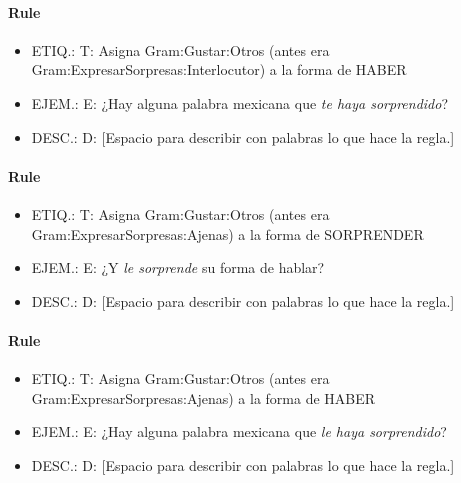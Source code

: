 \documentclass[11pt]{report}
\begin{document}
\paragraph*{Rule}
\begin{itemize}
\item ETIQ.:  T: Asigna Gram:Gustar:Otros (antes era Gram:ExpresarSorpresas:Interlocutor) a la forma de HABER
\item EJEM.:  E: ¿Hay alguna palabra mexicana que \emph{te haya sorprendido}?
\item DESC.:  D: [Espacio para describir con palabras lo que hace la regla.]
\end{itemize}

\paragraph*{Rule}
\begin{itemize}
\item ETIQ.:  T: Asigna Gram:Gustar:Otros (antes era Gram:ExpresarSorpresas:Ajenas) a la forma de SORPRENDER
\item EJEM.:  E: ¿Y \emph{le sorprende} su forma de hablar?
\item DESC.:  D: [Espacio para describir con palabras lo que hace la regla.]
\end{itemize}

\paragraph*{Rule}
\begin{itemize}
\item ETIQ.:  T: Asigna Gram:Gustar:Otros (antes era Gram:ExpresarSorpresas:Ajenas) a la forma de HABER
\item EJEM.:  E: ¿Hay alguna palabra mexicana que \emph{le haya sorprendido}?
\item DESC.:  D: [Espacio para describir con palabras lo que hace la regla.]
\end{itemize}
\end{document}
